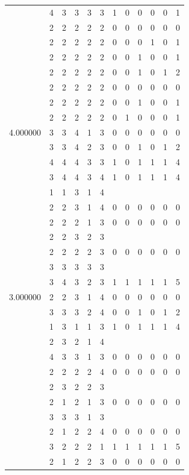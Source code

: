 \documentclass[]{book}
\theoremstyle{definition}
\theoremstyle{definition}
\theoremstyle{definition}
\theoremstyle{remark}
\begin{document}
\begin{table}
{\begin{tabular}[t]{rrrrrrrrrrrr}
 & 4 & 3 & 3 & 3 & 3 & 1 & 0 & 0 & 0 & 0 & 1\\
 & 2 & 2 & 2 & 2 & 2 & 0 & 0 & 0 & 0 & 0 & 0\\
 & 2 & 2 & 2 & 2 & 2 & 0 & 0 & 0 & 1 & 0 & 1\\
 & 2 & 2 & 2 & 2 & 2 & 0 & 0 & 1 & 0 & 0 & 1\\
 & 2 & 2 & 2 & 2 & 2 & 0 & 0 & 1 & 0 & 1 & 2\\
 & 2 & 2 & 2 & 2 & 2 & 0 & 0 & 0 & 0 & 0 & 0\\
 & 2 & 2 & 2 & 2 & 2 & 0 & 0 & 1 & 0 & 0 & 1\\
 & 2 & 2 & 2 & 2 & 2 & 0 & 1 & 0 & 0 & 0 & 1\\
4.000000 & 3 & 3 & 4 & 1 & 3 & 0 & 0 & 0 & 0 & 0 & 0\\
 & 3 & 3 & 4 & 2 & 3 & 0 & 0 & 1 & 0 & 1 & 2\\
 & 4 & 4 & 4 & 3 & 3 & 1 & 0 & 1 & 1 & 1 & 4\\
 & 3 & 4 & 4 & 3 & 4 & 1 & 0 & 1 & 1 & 1 & 4\\
 & 1 & 1 & 3 & 1 & 4 &  &  &  &  &  & \\
 & 2 & 2 & 3 & 1 & 4 & 0 & 0 & 0 & 0 & 0 & 0\\
 & 2 & 2 & 2 & 1 & 3 & 0 & 0 & 0 & 0 & 0 & 0\\
 & 2 & 2 & 3 & 2 & 3 &  &  &  &  &  & \\
 & 2 & 2 & 2 & 2 & 3 & 0 & 0 & 0 & 0 & 0 & 0\\
 & 3 & 3 & 3 & 3 & 3 &  &  &  &  &  & \\
 & 3 & 4 & 3 & 2 & 3 & 1 & 1 & 1 & 1 & 1 & 5\\
3.000000 & 2 & 2 & 3 & 1 & 4 & 0 & 0 & 0 & 0 & 0 & 0\\
 & 3 & 3 & 3 & 2 & 4 & 0 & 0 & 1 & 0 & 1 & 2\\
 & 1 & 3 & 1 & 1 & 3 & 1 & 0 & 1 & 1 & 1 & 4\\
 & 2 & 3 & 2 & 1 & 4 &  &  &  &  &  & \\
 & 4 & 3 & 3 & 1 & 3 & 0 & 0 & 0 & 0 & 0 & 0\\
 & 2 & 2 & 2 & 2 & 4 & 0 & 0 & 0 & 0 & 0 & 0\\
 & 2 & 3 & 2 & 2 & 3 &  &  &  &  &  & \\
 & 2 & 1 & 2 & 1 & 3 & 0 & 0 & 0 & 0 & 0 & 0\\
 & 3 & 3 & 3 & 1 & 3 &  &  &  &  &  & \\
 & 2 & 1 & 2 & 2 & 4 & 0 & 0 & 0 & 0 & 0 & 0\\
 & 3 & 2 & 2 & 2 & 1 & 1 & 1 & 1 & 1 & 1 & 5\\
 & 2 & 1 & 2 & 2 & 3 & 0 & 0 & 0 & 0 & 0 & 0\\

\end{tabular}}
\end{table}
\end{document}

